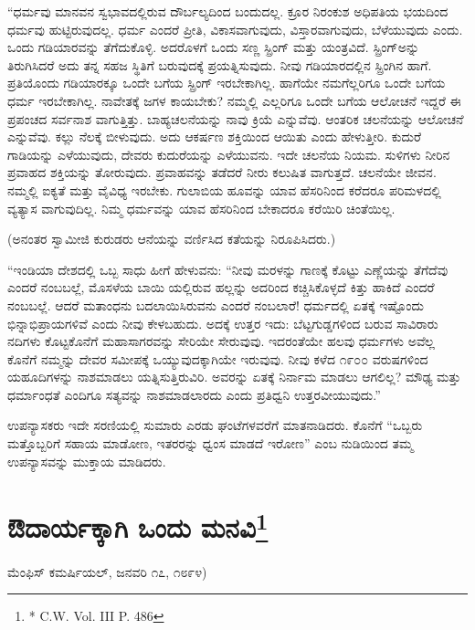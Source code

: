 “ಧರ್ಮವು ಮಾನವನ ಸ್ವಭಾವದಲ್ಲಿರುವ ದೌರ್ಬಲ್ಯದಿಂದ ಬಂದುದಲ್ಲ. ಕ್ರೂರ ನಿರಂಕುಶ ಅಧಿಪತಿಯ ಭಯದಿಂದ ಧರ್ಮವು ಹುಟ್ಟಿರುವುದಲ್ಲ. ಧರ್ಮ ಎಂದರೆ ಪ್ರೀತಿ, ವಿಕಾಸವಾಗುವುದು, ವಿಸ್ತಾರವಾಗುವುದು, ಬೆಳೆಯುವುದು ಎಂದು. ಒಂದು ಗಡಿಯಾರವನ್ನು ತೆಗೆದುಕೊಳ್ಳಿ. ಅದರೊಳಗೆ ಒಂದು ಸಣ್ಣ ಸ್ಪ್ರಿಂಗ್​ ಮತ್ತು ಯಂತ್ರವಿದೆ. ಸ್ಪ್ರಿಂಗ್​ ಅನ್ನು ತಿರುಗಿಸಿದರೆ ಅದು ತನ್ನ ಸಹಜ ಸ್ಥಿತಿಗೆ ಬರುವುದಕ್ಕೆ ಪ್ರಯತ್ನಿಸುವುದು. ನೀವು ಗಡಿಯಾರದಲ್ಲಿನ ಸ್ಪ್ರಿಂಗಿನ ಹಾಗೆ. ಪ್ರತಿಯೊಂದು ಗಡಿಯಾರಕ್ಕೂ ಒಂದೇ ಬಗೆಯ ಸ್ಪ್ರಿಂಗ್​ ಇರಬೇಕಾಗಿಲ್ಲ. ಹಾಗೆಯೇ ನಮಗೆಲ್ಲರಿಗೂ ಒಂದೇ ಬಗೆಯ ಧರ್ಮ ಇರಬೇಕಾಗಿಲ್ಲ. ನಾವೇತಕ್ಕೆ ಜಗಳ ಕಾಯಬೇಕು? ನಮ್ಮಲ್ಲಿ ಎಲ್ಲರಿಗೂ ಒಂದೇ ಬಗೆಯ ಆಲೋಚನೆ ಇದ್ದರೆ ಈ ಪ್ರಪಂಚದ ಸರ್ವನಾಶ ವಾಗುತ್ತಿತ್ತು. ಬಾಹ್ಯಚಲನೆಯನ್ನು ನಾವು ಕ್ರಿಯೆ ಎನ್ನುವೆವು. ಆಂತರಿಕ ಚಲನೆಯನ್ನು ಆಲೋಚನೆ ಎನ್ನುವೆವು. ಕಲ್ಲು ನೆಲಕ್ಕೆ ಬೀಳುವುದು. ಅದು ಆಕರ್ಷಣ ಶಕ್ತಿಯಿಂದ ಆಯಿತು ಎಂದು ಹೇಳುತ್ತೀರಿ. ಕುದುರೆ ಗಾಡಿಯನ್ನು ಎಳೆಯುವುದು, ದೇವರು ಕುದುರೆಯನ್ನು ಎಳೆಯುವನು. ಇದೇ ಚಲನೆಯ ನಿಯಮ. ಸುಳಿಗಳು ನೀರಿನ ಪ್ರವಾಹದ ಶಕ್ತಿಯನ್ನು ತೋರುವುದು. ಪ್ರವಾಹವನ್ನು ತಡೆದರೆ ನೀರು ಕಲುಷಿತ ವಾಗುತ್ತದೆ. ಚಲನೆಯೇ ಜೀವನ. ನಮ್ಮಲ್ಲಿ ಐಕ್ಯತೆ ಮತ್ತು ವೈವಿಧ್ಯ ಇರಬೇಕು. ಗುಲಾಬಿಯ ಹೂವನ್ನು ಯಾವ ಹೆಸರಿನಿಂದ ಕರೆದರೂ ಪರಿಮಳದಲ್ಲಿ ವ್ಯತ್ಯಾಸ ವಾಗುವುದಿಲ್ಲ. ನಿಮ್ಮ ಧರ್ಮವನ್ನು ಯಾವ ಹೆಸರಿನಿಂದ ಬೇಕಾದರೂ ಕರೆಯಿರಿ ಚಿಂತೆಯಿಲ್ಲ.

(ಅನಂತರ ಸ್ವಾಮೀಜಿ ಕುರುಡರು ಆನೆಯನ್ನು ವರ್ಣಿಸಿದ ಕತೆಯನ್ನು ನಿರೂಪಿಸಿದರು.)

“ಇಂಡಿಯಾ ದೇಶದಲ್ಲಿ ಒಬ್ಬ ಸಾಧು ಹೀಗೆ ಹೇಳುವನು: “ನೀವು ಮರಳನ್ನು ಗಾಣಕ್ಕೆ ಕೊಟ್ಟು ಎಣ್ಣೆಯನ್ನು ತೆಗೆದೆವು ಎಂದರೆ ನಂಬಬಲ್ಲೆ, ಮೊಸಳೆಯ ಬಾಯಿ ಯಲ್ಲಿರುವ ಹಲ್ಲನ್ನು ಅದರಿಂದ ಕಚ್ಚಿಸಿಕೊಳ್ಳದೆ ಕಿತ್ತು ಹಾಕಿದೆ ಎಂದರೆ ನಂಬಬಲ್ಲೆ. ಆದರೆ ಮತಾಂಧನು ಬದಲಾಯಿಸಿರುವನು ಎಂದರೆ ನಂಬಲಾರೆ! ಧರ್ಮದಲ್ಲಿ ಏತಕ್ಕೆ ಇಷ್ಟೊಂದು ಭಿನ್ನಾಭಿಪ್ರಾಯಗಳಿವೆ ಎಂದು ನೀವು ಕೇಳಬಹುದು. ಅದಕ್ಕೆ ಉತ್ತರ ಇದು: ಬೆಟ್ಟಗುಡ್ಡಗಳಿಂದ ಬರುವ ಸಾವಿರಾರು ನದಿಗಳು ಕೊಟ್ಟಕೊನೆಗೆ ಮಹಾಸಾಗರವನ್ನು ಸೇರಿಯೇ ಸೇರುವುವು. ಇದರಂತೆಯೇ ಹಲವು ಧರ್ಮಗಳು ಅವೆಲ್ಲ ಕೊನೆಗೆ ನಮ್ಮನ್ನು ದೇವರ ಸಮೀಪಕ್ಕೆ ಒಯ್ಯುವುದಕ್ಕಾಗಿಯೇ ಇರುವುವು. ನೀವು ಕಳೆದ ೧೯೦೦ ವರುಷಗಳಿಂದ ಯಹೂದಿಗಳನ್ನು ನಾಶಮಾಡಲು ಯತ್ನಿಸುತ್ತಿರುವಿರಿ. ಅವರನ್ನು ಏತಕ್ಕೆ ನಿರ್ನಾಮ ಮಾಡಲು ಆಗಲಿಲ್ಲ? ಮೌಢ್ಯ ಮತ್ತು ಧರ್ಮಾಂಧತೆ ಎಂದಿಗೂ ಸತ್ಯವನ್ನು ನಾಶಮಾಡ\break ಲಾರದು ಎಂದು ಪ್ರತಿಧ್ವನಿ ಉತ್ತರವೀಯುವುದು.”

ಉಪನ್ಯಾಸಕರು ಇದೇ ಸರಣಿಯಲ್ಲಿ ಸುಮಾರು ಎರಡು ಘಂಟೆಗಳವರೆಗೆ ಮಾತನಾಡಿದರು. ಕೊನೆಗೆ “ಒಬ್ಬರು ಮತ್ತೊಬ್ಬರಿಗೆ ಸಹಾಯ ಮಾಡೋಣ, ಇತರರನ್ನು ಧ್ವಂಸ ಮಾಡದೆ ಇರೋಣ” ಎಂಬ ನುಡಿಯಿಂದ ತಮ್ಮ ಉಪನ್ಯಾಸವನ್ನು ಮುಕ್ತಾಯ ಮಾಡಿದರು.

\delimiter


\section[ಔದಾರ್ಯಕ್ಕಾಗಿ ಒಂದು ಮನವಿ]{ಔದಾರ್ಯಕ್ಕಾಗಿ ಒಂದು ಮನವಿ\protect\footnote{* C.W. Vol. III P. 486}}

\begin{center}
ಮೆಂಫಿಸ್​ ಕಮರ್ಷಿಯಲ್​, ಜನವರಿ ೧೭, ೧೮೯೪)
\end{center}

